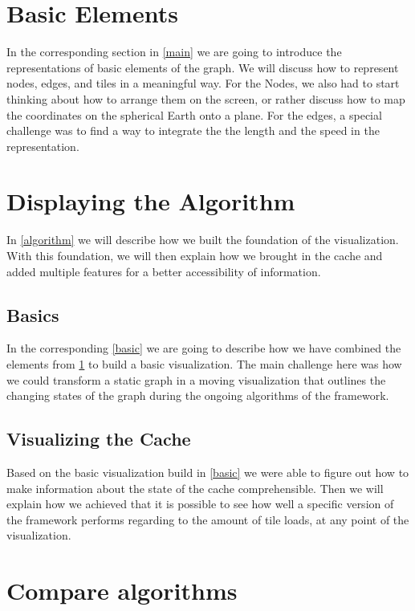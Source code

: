 \documentclass
[
    paper = a4,
    pagesize,
    12 pt,
    oneside,                       %
    open = right,
    DIV = calc,
    BCOR = 0 mm,                   %
    bibtotoc
]
{scrbook}
\begin{document}
\section{Basic Elements} \label{graph}

In the corresponding section in \cref{main} we are going to introduce the representations of basic elements of the graph.
We will discuss how to represent nodes, edges, and tiles in a meaningful way.
For the Nodes, we also had to start thinking about how to arrange them on the screen, or rather discuss how to map the coordinates on the spherical Earth onto a plane.
For the edges, a special challenge was to find a way to integrate the the length and the speed in the representation.


\section{Displaying the Algorithm}

In \cref{algorithm} we will describe how we built the foundation of the visualization.
With this foundation, we will then explain how we brought in the cache and added multiple features for a better accessibility of information.


\subsection{Basics}

In the corresponding \cref{basic} we are going to describe how we have combined the elements from \cref{graph} to build a basic visualization.
The main challenge here was how we could transform a static graph in a moving visualization that outlines the changing states of the graph during the ongoing algorithms of the framework.


\subsection{Visualizing the Cache} \label{pre_cache}


Based on the basic visualization build in \cref{basic} we were able to figure out how to make information about the state of the cache comprehensible.
Then we will explain how we achieved that it is possible to see how well a specific version of the framework performs regarding to the amount of tile loads, at any point of the visualization.


\section{Compare algorithms}
\end{document}
